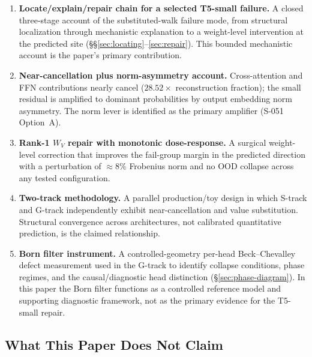 \begin{enumerate}
  \item \textbf{Locate/explain/repair chain for a selected T5-small failure.}
    A closed three-stage account of the substituted-walk failure mode, from structural
    localization through mechanistic explanation to a weight-level intervention at the
    predicted site (\S\S\ref{sec:locating}--\ref{sec:repair}).
    This bounded mechanistic account is the paper's primary contribution.

  \item \textbf{Near-cancellation plus norm-asymmetry account.}
    Cross-attention and FFN contributions nearly cancel ($28.52\times$ reconstruction
    fraction); the small residual is amplified to dominant probabilities by output
    embedding norm asymmetry.
    The norm lever is identified as the primary amplifier (S-051 Option~A).

  \item \textbf{Rank-1 $W_V$ repair with monotonic dose-response.}
    A surgical weight-level correction that improves the fail-group margin in the
    predicted direction with a perturbation of ${\approx}8\%$ Frobenius norm and no OOD
    collapse across any tested configuration.

  \item \textbf{Two-track methodology.}
    A parallel production/toy design in which S-track and G-track independently
    exhibit near-cancellation and value substitution.
    Structural convergence across architectures, not calibrated quantitative prediction,
    is the claimed relationship.

  \item \textbf{Born filter instrument.}
    A controlled-geometry per-head Beck--Chevalley defect measurement used in the
    G-track to identify collapse conditions, phase regimes, and the causal/diagnostic
    head distinction (\S\ref{sec:phase-diagram}).
    In this paper the Born filter functions as a controlled reference model and
    supporting diagnostic framework, not as the primary evidence for the T5-small repair.
\end{enumerate}

\subsection{What This Paper Does Not Claim}

